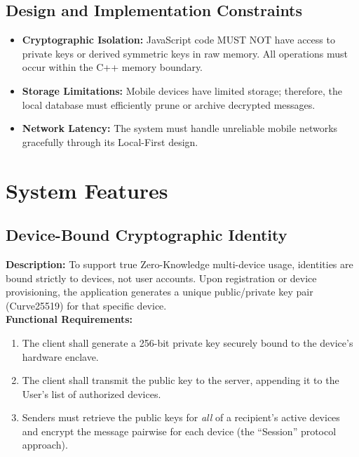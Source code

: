 \documentclass[12pt, a4paper]{article}
\begin{document}
\subsection{Design and Implementation Constraints}
\begin{itemize}
    \item \textbf{Cryptographic Isolation:} JavaScript code MUST NOT have access to private keys or derived symmetric keys in raw memory. All operations must occur within the C++ memory boundary.
    \item \textbf{Storage Limitations:} Mobile devices have limited storage; therefore, the local database must efficiently prune or archive decrypted messages.
    \item \textbf{Network Latency:} The system must handle unreliable mobile networks gracefully through its Local-First design.
\end{itemize}

\section{System Features}

\subsection{Device-Bound Cryptographic Identity}
\textbf{Description:} To support true Zero-Knowledge multi-device usage, identities are bound strictly to devices, not user accounts. Upon registration or device provisioning, the application generates a unique public/private key pair (Curve25519) for that specific device.\\
\textbf{Functional Requirements:}
\begin{enumerate}
    \item The client shall generate a 256-bit private key securely bound to the device's hardware enclave.
    \item The client shall transmit the public key to the server, appending it to the User's list of authorized devices.
    \item Senders must retrieve the public keys for \textit{all} of a recipient's active devices and encrypt the message pairwise for each device (the ``Session'' protocol approach).
\end{enumerate}
\end{document}
